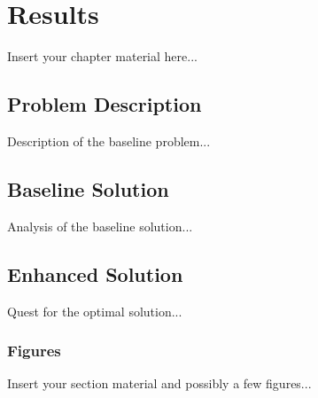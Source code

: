 
\chapter{Results}
\label{chapter:results}

Insert your chapter material here...


\section{Problem Description}
\label{section:problem}

Description of the baseline problem...


\section{Baseline Solution}
\label{section:baseline}

Analysis of the baseline solution...


\section{Enhanced Solution}
\label{section:enhanced}

Quest for the optimal solution...


\subsection{Figures}
\label{subsection:figures}

Insert your section material and possibly a few figures...

